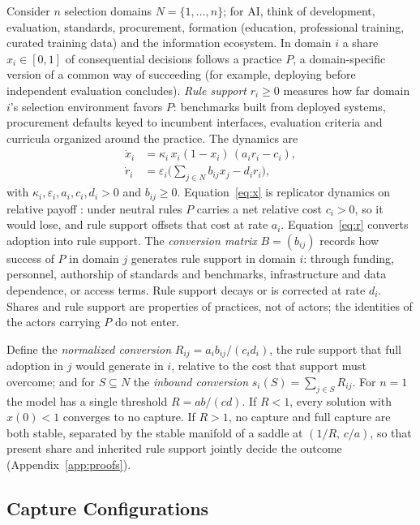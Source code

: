 \documentclass[letterpaper]{article} %
\theoremstyle{definition}
\begin{document}
Consider $n$ selection domains $N=\{1,\dots,n\}$; for AI, think of development, evaluation, standards, procurement, formation (education, professional training, curated training data) and the information ecosystem. In domain $i$ a share $x_i\in[0,1]$ of consequential decisions follows a practice $P$, a domain-specific version of a common way of succeeding (for example, deploying before independent evaluation concludes). \emph{Rule support} $r_i\ge 0$ measures how far domain $i$'s selection environment favors $P$: benchmarks built from deployed systems, procurement defaults keyed to incumbent interfaces, evaluation criteria and curricula organized around the practice. The dynamics are
\begin{align}
\dot x_i&=\kappa_i\,x_i(1-x_i)\,(a_i r_i-c_i),\label{eq:x}\\
\dot r_i&=\varepsilon_i\Big(\sum_{j\in N} b_{ij}x_j-d_i r_i\Big),\label{eq:r}
\end{align}
with $\kappa_i,\varepsilon_i,a_i,c_i,d_i>0$ and $b_{ij}\ge0$. Equation~\eqref{eq:x} is replicator dynamics on relative payoff \citep{hofbauer1998}: under neutral rules $P$ carries a net relative cost $c_i>0$, so it would lose, and rule support offsets that cost at rate $a_i$. Equation~\eqref{eq:r} converts adoption into rule support. The \emph{conversion matrix} $B=(b_{ij})$ records how success of $P$ in domain $j$ generates rule support in domain $i$: through funding, personnel, authorship of standards and benchmarks, infrastructure and data dependence, or access terms. Rule support decays or is corrected at rate $d_i$. Shares and rule support are properties of practices, not of actors; the identities of the actors carrying $P$ do not enter.

Define the \emph{normalized conversion} $R_{ij}=a_ib_{ij}/(c_id_i)$, the rule support that full adoption in $j$ would generate in $i$, relative to the cost that support must overcome; and for $S\subseteq N$ the \emph{inbound conversion} $s_i(S)=\sum_{j\in S}R_{ij}$. For $n=1$ the model has a single threshold $R=ab/(cd)$. If $R<1$, every solution with $x(0)<1$ converges to no capture. If $R>1$, no capture and full capture are both stable, separated by the stable manifold of a saddle at $(1/R,\,c/a)$, so that present share and inherited rule support jointly decide the outcome (Appendix~\ref{app:proofs}).

\subsection{Capture Configurations}
\end{document}
